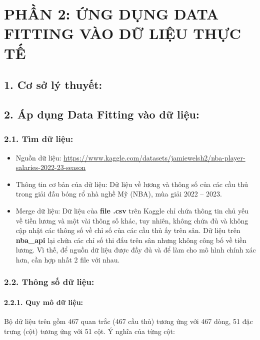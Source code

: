 \section*{PHẦN 2: ỨNG DỤNG DATA FITTING VÀO DỮ LIỆU THỰC TẾ}

\subsection*{1. Cơ sở lý thuyết:}

\subsection*{2. Áp dụng Data Fitting vào dữ liệu:}

\subsubsection*{2.1. Tìm dữ liệu:}

\begin{itemize}
    \item Nguồn dữ liệu: \url{https://www.kaggle.com/datasets/jamiewelsh2/nba-player-salaries-2022-23-season}
    \item Thông tin cơ bản của dữ liệu: Dữ liệu về lương và thông số của các cầu thủ trong giải đấu bóng rổ nhà nghề Mỹ (NBA), mùa giải 2022 – 2023.
    \item Merge dữ liệu: Dữ liệu của \textbf{file .csv} trên Kaggle chỉ chứa thông tin chủ yếu về tiền lương và một vài thông số khác, tuy nhiên, không chứa đủ và không cập nhật các thông số về chỉ số của các cầu thủ ấy trên sân. Dữ liệu trên \textbf{nba\_api} lại chứa các chỉ số thi đấu trên sân nhưng không công bố về tiền lương. Vì thế, để nguồn dữ liệu được đầy đủ và để làm cho mô hình chính xác hơn, cần hợp nhất 2 file với nhau.
\end{itemize}

\subsubsection*{2.2. Thông số dữ liệu:}

\paragraph*{2.2.1. Quy mô dữ liệu:} Bộ dữ liệu trên gồm 467 quan trắc (467 cầu thủ) tương ứng với 467 dòng, 51 đặc trưng (cột) tương ứng với 51 cột. Ý nghĩa của từng cột:

